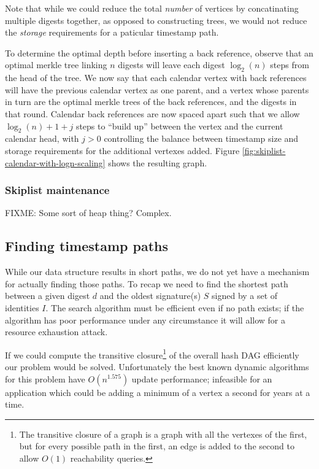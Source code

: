 \documentclass{article}
\begin{document}
Note that while we could reduce the total \emph{number} of vertices by
concatinating multiple digests together, as opposed to constructing trees, we
would not reduce the \emph{storage} requirements for a paticular timestamp
path.

To determine the optimal depth before inserting a back reference, observe that
an optimal merkle tree linking $n$ digests will leave each digest $\log_2(n)$
steps from the head of the tree. We now say that each calendar vertex with back
references will have the previous calendar vertex as one parent, and a vertex
whose parents in turn are the optimal merkle trees of the back references, and
the digests in that round. Calendar back references are now spaced apart such
that we allow $\log_2(n) + 1 + j$ steps to ``build up'' between the vertex and
the current calendar head, with $j>0$ controlling the balance between timestamp
size and storage requirements for the additional vertexes added. Figure
\ref{fig:skiplist-calendar-with-logn-scaling} shows the resulting graph.

\subsubsection{Skiplist maintenance}

FIXME: Some sort of heap thing? Complex.


\subsection{Finding timestamp paths}

While our data structure results in short paths, we do not yet have a mechanism
for actually finding those paths. To recap we need to find the shortest path
between a given digest $d$ and the oldest signature(s) $S$ signed by a set of
identities $I$. The search algorithm must be efficient even if no path exists;
if the algorithm has poor performance under any circumstance it will allow for
a resource exhaustion attack.

If we could compute the transitive closure\footnote{The transitive closure of a
graph is a graph with all the vertexes of the first, but for every possible
path in the first, an edge is added to the second to allow $O(1)$ reachability
queries.} of the overall hash DAG efficiently our problem would be solved.
Unfortunately the best known dynamic algorithms for this problem have
$O(n^{1.575})$ update performance;\cite{Demetrescu05trade-offsfor} infeasible
for an application which could be adding a minimum of a vertex a second for
years at a time. 
\end{document}
